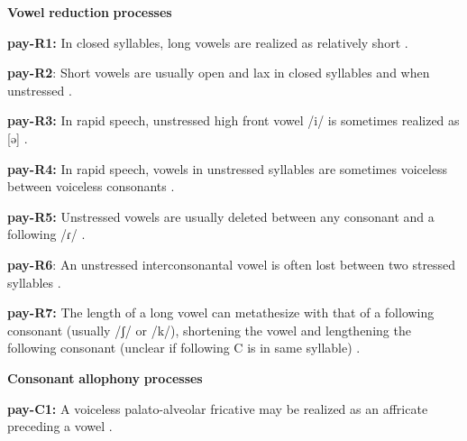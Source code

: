 \documentclass[output=paper]{langsci/langscibook}
\begin{document}
\begin{styleBody}
\textbf{Vowel} \textbf{reduction} \textbf{processes}
\end{styleBody}

\begin{styleBody}
\textbf{pay-R1:} In closed syllables, long vowels are realized as relatively short \citep[18]{Holt1999}.
\end{styleBody}

\begin{styleBody}
\textbf{pay-R2}: Short vowels are usually open and lax in closed syllables and when unstressed \citep[18]{Holt1999}.
\end{styleBody}

\begin{styleBody}
\textbf{pay-R3:} In rapid speech, unstressed high front vowel /i/ is sometimes realized as [ə] \citep[18]{Holt1999}.
\end{styleBody}

\begin{styleBody}
\textbf{pay-R4:} In rapid speech, vowels in unstressed syllables are sometimes voiceless between voiceless consonants \citep[18]{Holt1999}.
\end{styleBody}

\begin{styleBody}
\textbf{pay-R5:} Unstressed vowels are usually deleted between any consonant and a following /ɾ/ \citep[23]{Holt1999}.
\end{styleBody}

\begin{styleBody}
\textbf{pay-R6}: An unstressed interconsonantal vowel is often lost between two stressed syllables \citep[23]{Holt1999}.
\end{styleBody}

\begin{styleBody}
\textbf{pay-R7:} The length of a long vowel can metathesize with that of a following consonant (usually /ʃ/ or /k/), shortening the vowel and lengthening the following consonant (unclear if following C is in same syllable) \citep[24-5]{Holt1999}.
\end{styleBody}

\begin{styleBody}
\textbf{Consonant} \textbf{allophony} \textbf{processes}
\end{styleBody}

\begin{styleBody}
\textbf{pay-C1:} A voiceless palato-alveolar fricative may be realized as an affricate preceding a vowel \citep[16]{Holt1999}.
\end{styleBody}
\end{document}
